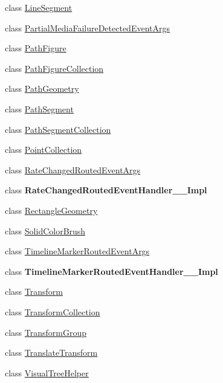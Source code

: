 \begin{DoxyCompactItemize}
class \hyperlink{class_windows_1_1_u_i_1_1_xaml_1_1_media_1_1_line_segment}{Line\+Segment}
\item 
class \hyperlink{class_windows_1_1_u_i_1_1_xaml_1_1_media_1_1_partial_media_failure_detected_event_args}{Partial\+Media\+Failure\+Detected\+Event\+Args}
\item 
class \hyperlink{class_windows_1_1_u_i_1_1_xaml_1_1_media_1_1_path_figure}{Path\+Figure}
\item 
class \hyperlink{class_windows_1_1_u_i_1_1_xaml_1_1_media_1_1_path_figure_collection}{Path\+Figure\+Collection}
\item 
class \hyperlink{class_windows_1_1_u_i_1_1_xaml_1_1_media_1_1_path_geometry}{Path\+Geometry}
\item 
class \hyperlink{class_windows_1_1_u_i_1_1_xaml_1_1_media_1_1_path_segment}{Path\+Segment}
\item 
class \hyperlink{class_windows_1_1_u_i_1_1_xaml_1_1_media_1_1_path_segment_collection}{Path\+Segment\+Collection}
\item 
class \hyperlink{class_windows_1_1_u_i_1_1_xaml_1_1_media_1_1_point_collection}{Point\+Collection}
\item 
class \hyperlink{class_windows_1_1_u_i_1_1_xaml_1_1_media_1_1_rate_changed_routed_event_args}{Rate\+Changed\+Routed\+Event\+Args}
\item 
class {\bfseries Rate\+Changed\+Routed\+Event\+Handler\+\_\+\+\_\+\+Impl}
\item 
class \hyperlink{class_windows_1_1_u_i_1_1_xaml_1_1_media_1_1_rectangle_geometry}{Rectangle\+Geometry}
\item 
class \hyperlink{class_windows_1_1_u_i_1_1_xaml_1_1_media_1_1_solid_color_brush}{Solid\+Color\+Brush}
\item 
class \hyperlink{class_windows_1_1_u_i_1_1_xaml_1_1_media_1_1_timeline_marker_routed_event_args}{Timeline\+Marker\+Routed\+Event\+Args}
\item 
class {\bfseries Timeline\+Marker\+Routed\+Event\+Handler\+\_\+\+\_\+\+Impl}
\item 
class \hyperlink{class_windows_1_1_u_i_1_1_xaml_1_1_media_1_1_transform}{Transform}
\item 
class \hyperlink{class_windows_1_1_u_i_1_1_xaml_1_1_media_1_1_transform_collection}{Transform\+Collection}
\item 
class \hyperlink{class_windows_1_1_u_i_1_1_xaml_1_1_media_1_1_transform_group}{Transform\+Group}
\item 
class \hyperlink{class_windows_1_1_u_i_1_1_xaml_1_1_media_1_1_translate_transform}{Translate\+Transform}
\item 
class \hyperlink{class_windows_1_1_u_i_1_1_xaml_1_1_media_1_1_visual_tree_helper}{Visual\+Tree\+Helper}
\end{DoxyCompactItemize}
